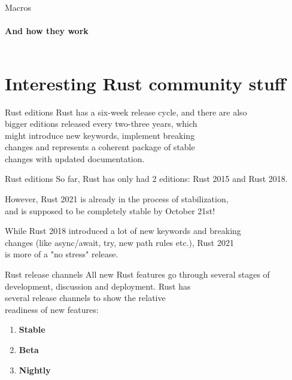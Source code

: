\documentclass[usenames,dvipsnames,10pt,aspectratio=169]{beamer}
\begin{document}
\begin{frame}{Macros}
	\framesubtitle{And how they work}
	\inputminted[fontsize=\large]{rust}{code/macros3.rs}
\end{frame}


\section{Interesting Rust community stuff}

\begin{frame}{Rust editions}
	\Large
	Rust has a six-week release cycle, and there are also\\
	bigger editions released every two-three years, which\\
	might introduce new keywords, implement breaking\\
	changes	and represents a coherent package of stable\\
	changes with updated documentation.\\

\end{frame}

\begin{frame}{Rust editions}
	\large
	So far, Rust has only had 2 editions: Rust 2015 and Rust 2018.\\

	\vspace{0.3cm}
	
	However, Rust 2021 is already in the process of stabilization,\\
	and is supposed to be completely stable by October 21st!\\

	\vspace{0.3cm}
	
	While Rust 2018 introduced a lot of new keywords and breaking\\
	changes (like \textcolor{ucuyellow}{async}/\textcolor{ucuyellow}{await}, \textcolor{ucuyellow}{try}, 
	new path rules etc.), Rust 2021\\
	is more of a "no stress" release.
\end{frame}

\begin{frame}{Rust release channels}
	\large
	All new Rust features go through several stages of\\
	development, discussion and deployment. Rust has\\
	several release channels to show the relative\\
	readiness of new features:\\
	\vspace{0.5cm}
	
	\begin{enumerate}
		\item \textbf{Stable}
		\item \textbf{Beta}
		\item \textbf{Nightly}
	\end{enumerate}
\end{frame}
\end{document}
